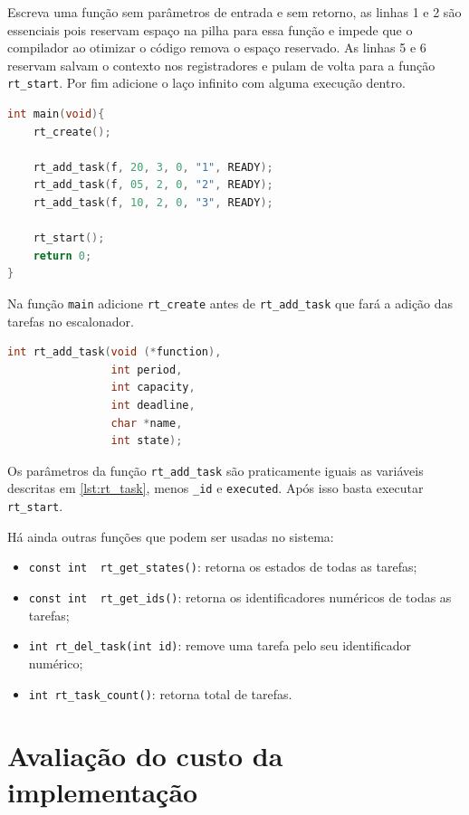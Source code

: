\documentclass[a4 paper]{article}
\begin{document}
Escreva uma função sem parâmetros de entrada e sem retorno, as linhas 1 e 2 são essenciais pois reservam espaço na pilha para essa função e impede que o compilador ao otimizar o código remova o espaço reservado. As linhas 5 e 6 reservam salvam o contexto nos registradores e pulam de volta para a função \verb|rt_start|. Por fim adicione o laço infinito com alguma execução dentro.

\begin{lstlisting}[captionpos=b, language=C, caption=Exemplo de uso]
int main(void){
    rt_create();

    rt_add_task(f, 20, 3, 0, "1", READY);
    rt_add_task(f, 05, 2, 0, "2", READY);
    rt_add_task(f, 10, 2, 0, "3", READY);

    rt_start();
    return 0;
}
\end{lstlisting}

Na função \verb|main| adicione \verb|rt_create| antes de \verb|rt_add_task| que fará a adição das tarefas no escalonador.
\begin{lstlisting}[captionpos=b, language=C, caption=Função de adição das tarefas]
int rt_add_task(void (*function), 
                int period, 
                int capacity, 
                int deadline, 
                char *name,  
                int state);
\end{lstlisting}

Os parâmetros da função \verb|rt_add_task| são praticamente iguais as variáveis descritas em \ref{lst:rt_task}, menos \verb|_id| e \verb|executed|. Após isso basta executar \verb|rt_start|.

Há ainda outras funções que podem ser usadas no sistema:
\begin{itemize}
    \item \verb|const int  rt_get_states()|: retorna os estados de todas as tarefas;
    \item \verb|const int  rt_get_ids()|: retorna os identificadores numéricos de todas as tarefas;
    \item \verb|int rt_del_task(int id)|: remove uma tarefa pelo seu identificador numérico;
    \item \verb|int rt_task_count()|: retorna total de tarefas.
\end{itemize}

\section{Avaliação do custo da implementação}
\end{document}
